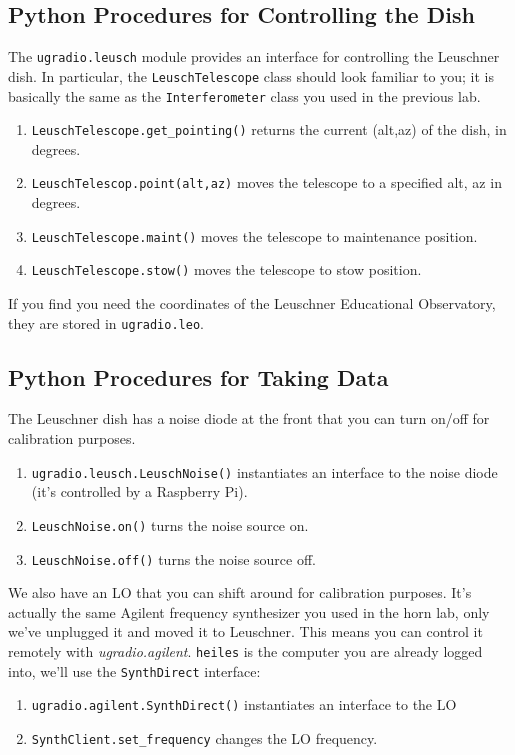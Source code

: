 \documentclass[psfig,preprint]{aastex}
\begin{document}
\subsection{Python Procedures for Controlling the Dish}

\noindent
The {\tt ugradio.leusch} module provides an interface for controlling
the Leuschner dish.  In particular, the {\tt LeuschTelescope} class should
look familiar to you; it is basically the same as the {\tt Interferometer}
class you used in the previous lab.

\begin{enumerate}
\item {\tt LeuschTelescope.get\_pointing()} returns the current (alt,az) of the dish, in degrees.
\item {\tt LeuschTelescop.point(alt,az)} moves the telescope to a specified alt, az in degrees.
\item {\tt LeuschTelescope.maint()} moves the telescope to maintenance position.
\item {\tt LeuschTelescope.stow()} moves the telescope to stow position.
\end{enumerate}

\noindent
If you find you need the coordinates of the Leuschner Educational Observatory, they are stored in
{\tt ugradio.leo}.

\subsection{Python Procedures for Taking Data}

\noindent
The Leuschner dish has a noise diode at the front that you can turn on/off for
calibration purposes.
\begin{enumerate}
\item {\tt ugradio.leusch.LeuschNoise()} instantiates an interface to the noise diode (it's controlled
by a Raspberry Pi).
\item {\tt LeuschNoise.on()} turns the noise source on.
\item {\tt LeuschNoise.off()} turns the noise source off.
\end{enumerate}

We also have an LO that you can shift around for calibration purposes.  It's actually the same
Agilent frequency synthesizer you used in the horn lab, only we've unplugged it and moved it to Leuschner.  This
means you can control it remotely with {\it ugradio.agilent}. 
 {\tt heiles} is the computer you are
already logged into, we'll use the {\tt SynthDirect} interface:
\begin{enumerate}
\item {\tt ugradio.agilent.SynthDirect()} instantiates an interface to the LO
\item {\tt SynthClient.set\_frequency} changes the LO frequency.
\end{enumerate}
\end{document}
